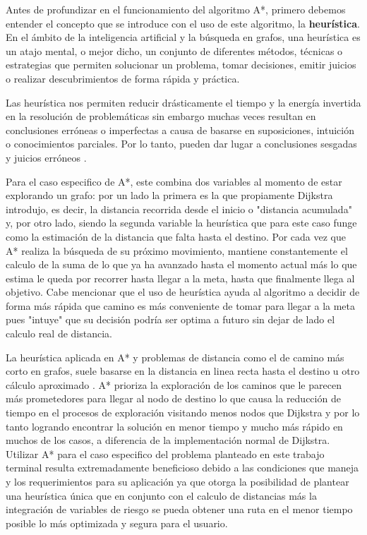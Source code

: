 \begin{itemize}
    Antes de profundizar en el funcionamiento del algoritmo A*, primero debemos entender el concepto que se introduce con el uso de este algoritmo, la \textbf{heurística}. En el ámbito de la inteligencia artificial y la búsqueda en grafos, una heurística es un atajo mental, o mejor dicho, un conjunto de diferentes métodos, técnicas o estrategias que permiten solucionar un problema, tomar decisiones, emitir juicios o realizar descubrimientos de forma rápida y práctica.

    Las heurística nos permiten reducir drásticamente el tiempo y la energía invertida en la resolución de problemáticas sin embargo muchas veces resultan en conclusiones erróneas o imperfectas a causa de basarse en suposiciones, intuición o conocimientos parciales. Por lo tanto, pueden dar lugar a conclusiones sesgadas y juicios erróneos \cite{heuristica_que}.

    Para el caso especifico de A*, este combina dos variables al momento de estar explorando un grafo: por un lado la primera es la que propiamente Dijkstra introdujo, es decir, la distancia recorrida desde el inicio o "distancia acumulada" y, por otro lado, siendo la segunda variable la heurística que para este caso funge como la estimación de la distancia que falta hasta el destino. Por cada vez que A* realiza la búsqueda de su próximo movimiento, mantiene constantemente el calculo de la suma de lo que ya ha avanzado hasta el momento actual más lo que estima le queda por recorrer hasta llegar a la meta, hasta que finalmente llega al objetivo. Cabe mencionar que el uso de heurística ayuda al algoritmo a decidir de forma más rápida que camino es más conveniente de tomar para llegar a la meta pues "intuye" que su decisión podría ser optima a futuro sin dejar de lado el calculo real de distancia. 

    La heurística aplicada en A* y problemas de distancia como el de camino más corto en grafos, suele basarse en la distancia en linea recta hasta el destino u otro cálculo aproximado \cite{dijkstra_udit}. A* prioriza la exploración de los caminos que le parecen más prometedores para llegar al nodo de destino lo que causa la reducción de tiempo en el procesos de exploración visitando menos nodos que Dijkstra y por lo tanto logrando encontrar la solución en menor tiempo y mucho más rápido en muchos de los casos, a diferencia de la implementación normal de Dijkstra. Utilizar A* para el caso especifico del problema planteado en este trabajo terminal resulta extremadamente beneficioso debido a las condiciones que maneja y los requerimientos para su aplicación ya que otorga la posibilidad de plantear una heurística única que en conjunto con el calculo de distancias más la integración de variables de riesgo se pueda obtener una ruta en el menor tiempo posible lo más optimizada y segura para el usuario.  


\end{itemize}
